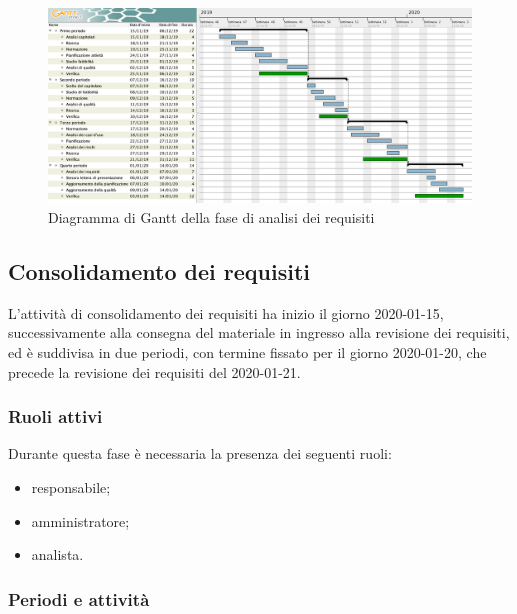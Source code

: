         \begin{landscape}

          \begin{figure}[H]
            \centering
            \includegraphics[width=\linewidth]{images/gantt/analisiDeiRequisiti}
            \caption{Diagramma di Gantt della fase di analisi dei requisiti}
          \end{figure}

		\end{landscape}
		
		\subsection{Consolidamento dei requisiti}
		
			L'attività di consolidamento dei requisiti ha inizio il giorno 2020-01-15, successivamente alla consegna del materiale in ingresso alla revisione dei requisiti, ed è suddivisa in due periodi, con termine fissato per il giorno 2020-01-20, che precede la revisione dei requisiti del 2020-01-21.
			
			\subsubsection{Ruoli attivi}
			
				Durante questa fase è necessaria la presenza dei seguenti ruoli:
				\begin{itemize}
					\item responsabile;
					\item amministratore;
					\item analista.
				\end{itemize}
			
			\subsubsection{Periodi e attività}
			
